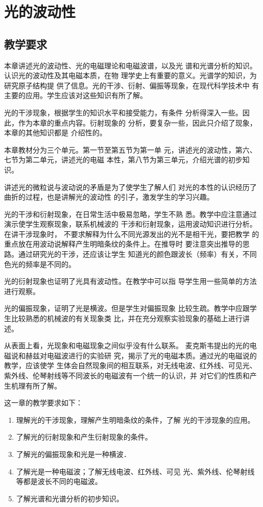 \chapter{光的波动性}\minitoc[n]
\section{教学要求}

本章讲述光的波动性、光的电磁理论和电磁波谱，以及光
谱和光谱分析的知识。认识光的波动性及其电磁本质，在物
理学史上有重要的意义。光谱学的知识，为研究原子结构提
供了信息。光的干涉、衍射、偏振等现象，在现代科学技术中
有主要的应用。学生应该对这些知识有所了解。

光的干涉现象，根据学生的知识水平和接受能力，有条件
分析得深入一些。因此，作为本章的重点内容。衍射现象的
分析，要复杂一些，因此只介绍了现象，本章的其他知识都是
介绍性的。

本章教材分为三个单元。第一节至第五节为第一单
元，讲述光的波动性，第六、七节为第二单元，讲述光的电磁
本性，第八节为第三单元，介绍光谱的初步知识。

讲述光的微粒说与波动说的矛盾是为了使学生了解人们
对光的本性的认识经历了曲折的过程，也是讲解光的波动性
的引子，激发学生的学习兴趣。

光的干涉和衍射现象，在日常生活中极易忽略，学生不熟
悉。教学中应注意通过演示使学生观察现象，联系机械波的
干涉和衍射现象，运用波动知识进行分析。在讲干涉现象时，
不要求解释为什么不同光源发出的光不是相干光，要把教学
的重点放在用波动说解释产生明暗条纹的条件上。在推导时
要注意突出推导的思路。通过研究光的干涉，还应该让学生
知道光的颜色跟波长（频率）有关，不同色光的频率是不同的。

光的衍射现象也证明了光具有波动性。在教学中可以指
导学生用一些简单的方法进行观察。

光的偏振现象，证明了光是横波。但是学生对偏振现象
比较生疏。教学中应跟学生比较熟悉的机械波的有关现象类
比，并在充分观察实验现象的基础上进行讲述。

从表面上看，光现象和电磁现象之间似乎没有什么联系。
麦克斯韦提出的光的电磁说和赫兹对电磁波进行的实验研
究，揭示了光的电磁本质。通过光的电磁说的教学，应该使学
生体会自然现象间的相互联系，对无线电波、红外线、可见光、
紫外线、伦琴射线等不同波长的电磁波有一个统一的认识，并
对它们的性质和产生机理有所了解。

这一章的教学要求如下：
\begin{enumerate}
\item 理解光的干涉现象，理解产生明暗条纹的条件，了解
光的干涉现象的应用。
\item 了解光的衍射现象和产生衍射现象的条件。
\item 了解光的偏振现象和光是一种横波．
\item 了解光是一种电磁波；了解无线电波、红外线、可见
光、紫外线、伦琴射线等都是波长不同的电磁波。
\item 了解光谱和光谱分析的初步知识。
\end{enumerate}


